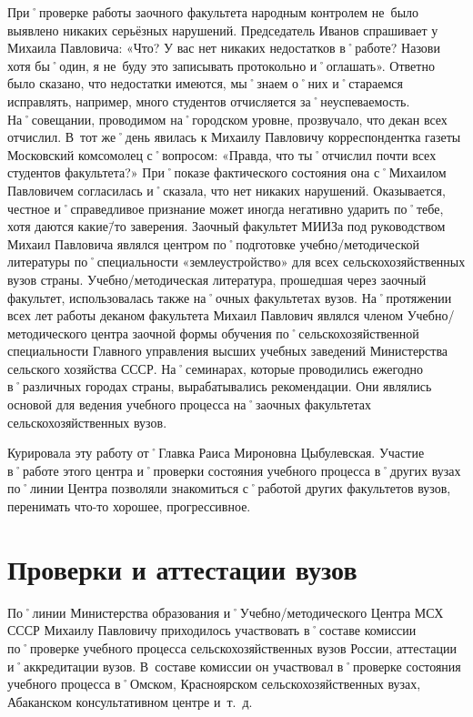 При˚проверке работы заочного факультета народным контролем не~было выявлено никаких серьёзных нарушений. Председатель Иванов спрашивает у Михаила Павловича: «Что? У вас нет никаких недостатков в˚работе? Назови хотя бы˚один, я не~буду это записывать протокольно и˚оглашать». Ответно было сказано, что недостатки имеются, мы˚знаем о˚них и˚стараемся исправлять, например, много  студентов отчисляется за˚неуспеваемость. На˚совещании, проводимом на˚городском уровне, прозвучало, что декан всех отчислил. В~тот же˚день явилась к Михаилу Павловичу корреспондентка газеты Московский комсомолец с˚вопросом: «Правда, что ты˚отчислил почти всех студентов факультета?» При˚показе фактического состояния она с˚Михаилом Павловичем согласилась и˚сказала, что нет никаких нарушений. Оказывается, честное и˚справедливое признание может иногда негативно ударить по˚тебе, хотя даются какие\=/то заверения. 
Заочный факультет МИИЗа под руководством Михаил Павловича являлся центром по˚подготовке учебно\-/методической литературы по˚специальности «землеустройство» для всех сельскохозяйственных вузов страны. Учебно\-/методическая литература, прошедшая через заочный факультет, использовалась также на˚очных факультетах вузов.
На˚протяжении всех лет работы деканом факультета Михаил Павлович являлся членом Учебно\-/методического центра заочной формы обучения по˚сельскохозяйственной специальности Главного управления высших учебных заведений Министерства сельского хозяйства СССР. На˚семинарах, которые проводились ежегодно в˚различных городах страны, вырабатывались рекомендации. Они являлись основой для ведения учебного процесса на˚заочных факультетах сельскохозяйственных вузов.

Курировала эту работу от˚Главка Раиса Мироновна Цыбулевская. Участие в˚работе этого центра и˚проверки состояния учебного процесса в˚других вузах по˚линии Центра позволяли знакомиться с˚работой других факультетов вузов, перенимать что-то хорошее, прогрессивное.

\section*{Проверки и аттестации вузов}
\label{sec:deskwork}

По˚линии Министерства образования и˚Учебно\-/методического Центра МСХ СССР Михаилу Павловичу приходилось  участвовать в˚составе комиссии по˚проверке учебного процесса сельскохозяйственных вузов России, аттестации и˚аккредитации вузов. В~составе комиссии он участвовал в˚проверке состояния учебного процесса в˚Омском, Красноярском сельскохозяйственных вузах, Абаканском консультативном центре и~т.~д.

